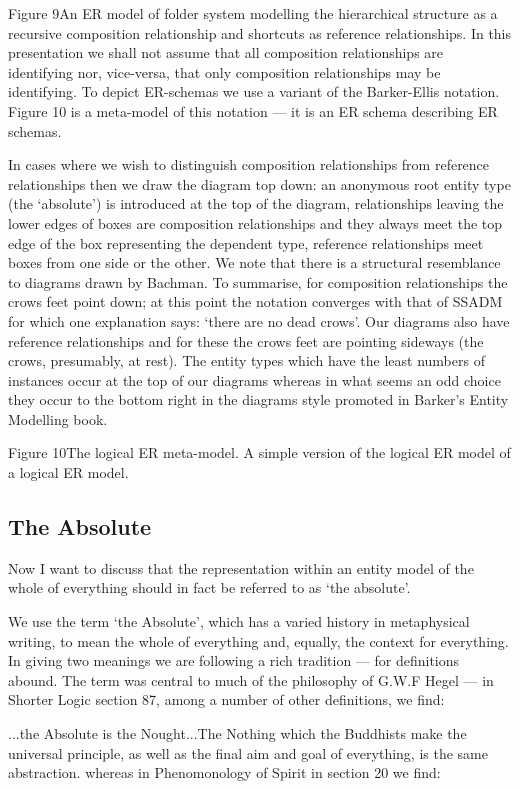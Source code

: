 Figure 9An ER model of folder system modelling the hierarchical structure as a recursive composition relationship and shortcuts as reference relationships.
In this presentation we shall not assume that all composition relationships are identifying nor, vice-versa, that only composition relationships may be identifying. To depict ER-schemas we use a variant of the Barker-Ellis notation. Figure 10 is a meta-model of this notation — it is an ER schema describing ER schemas.

In cases where we wish to distinguish composition relationships from reference relationships then we draw the diagram top down: an anonymous root entity type (the ‘absolute’) is introduced at the top of the diagram, relationships leaving the lower edges of boxes are composition relationships and they always meet the top edge of the box representing the dependent type, reference relationships meet boxes from one side or the other. We note that there is a structural resemblance to diagrams drawn by Bachman. To summarise, for composition relationships the crows feet point down; at this point the notation converges with that of SSADM for which one explanation says: ‘there are no dead crows’. Our diagrams also have reference relationships and for these the crows feet are pointing sideways (the crows, presumably, at rest). The entity types which have the least numbers of instances occur at the top of our diagrams whereas in what seems an odd choice they occur to the bottom right in the diagrams style promoted in Barker's Entity Modelling book.


Figure 10The logical ER meta-model. A simple version of the logical ER model of a logical ER model.

\subsection*{The Absolute}

Now  I want to discuss that the representation within an entity model of the whole of everything should in fact be referred to as `the absolute'.

We use the term ‘the Absolute’, which has a varied history in metaphysical writing, to mean the whole of everything and, equally, the context for everything. In giving two meanings we are following a rich tradition — for definitions abound. The term was central to much of the philosophy of G.W.F Hegel — in Shorter Logic section 87, among a number of other definitions, we find:

...the Absolute is the Nought...The Nothing which the Buddhists make the universal principle, as well as the final aim and goal of everything, is the same abstraction.
whereas in Phenomonology of Spirit in section 20 we find:

